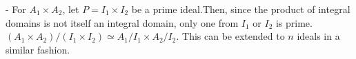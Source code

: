 \hspace*{10mm} - For $A_1\times A_2$, let $P=I_1\times I_2$ be a
prime ideal.Then, since the product of integral domains is not
itself an integral domain, only one from $I_1$ or $I_2$ is prime.
$(A_1\times A_2)/(I_1\times I_2)\simeq A_1/I_1 \times A_2/I_2$.
This can be extended to $n$ ideals in a similar fashion.